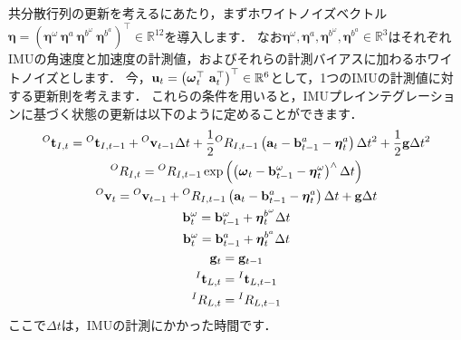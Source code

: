 共分散行列の更新を考えるにあたり，まずホワイトノイズベクトル$\boldsymbol \eta = \left( \boldsymbol \eta^{\omega} ~ \boldsymbol \eta^{a} ~ \boldsymbol \eta^{ b^{\omega} } ~ \boldsymbol \eta^{ b^{a} } \right)^{\top} \in \mathbb{R}^{12}$を導入します．
なお$\boldsymbol \eta^{\omega}, \boldsymbol \eta^{a}, \boldsymbol \eta^{ b^{\omega} }, \boldsymbol \eta^{ b^{a} } \in \mathbb{R}^{3}$はそれぞれIMUの角速度と加速度の計測値，およびそれらの計測バイアスに加わるホワイトノイズとします．
今，${\bf u}_{t} = \left( \boldsymbol \omega_{t}^{\top} ~ {\bf a}_{t}^{\top} \right)^{\top} \in \mathbb{R}^{6}$として，1つのIMUの計測値に対する更新則を考えます．
これらの条件を用いると，IMUプレインテグレーションに基づく状態の更新は以下のように定めることができます．
%
\begin{align}
  \begin{gathered}
    {}^{O}{\bf t}_{I, t} = {}^{O}{\bf t}_{I, t-1} + {}^{O}{\bf v}_{t-1} \Delta t + \frac{1}{2} {}^{O}R_{I, t-1} \left( {\bf a}_{t} - {\bf b}_{t-1}^{a} - \boldsymbol \eta_{t}^{a} \right)\Delta t^{2} + \frac{1}{2} {\bf g} \Delta t^{2} \\
%
    {}^{O}R_{I, t} = {}^{O}R_{I, t-1} \exp \left( \left( \boldsymbol \omega_{t} - {\bf b}_{t-1}^{\omega} - \boldsymbol \eta_{t}^{\omega} \right)^{\wedge} \Delta t \right) \\
%
    {}^{O}{\bf v}_{t} = {}^{O}{\bf v}_{t-1} + {}^{O}R_{I, t-1} \left( {\bf a}_{t} - {\bf b}_{t-1}^{a} - \boldsymbol \eta_{t}^{a} \right) \Delta t + {\bf g} \Delta t \\
%
    {\bf b}_{t}^{\omega} = {\bf b}_{t-1}^{\omega} + \boldsymbol \eta_{t}^{ b^{\omega} } \Delta t \\
%
    {\bf b}_{t}^{\omega} = {\bf b}_{t-1}^{a} + \boldsymbol \eta_{t}^{ b^{a} } \Delta t \\
%
    {\bf g}_{t} = {\bf g}_{t-1} \\
%
    {}^{I}{\bf t}_{L, t} = {}^{I}{\bf t}_{L, t-1} \\
%
    {}^{I}R_{L, t} = {}^{I}R_{L, t-1}
  \end{gathered}
  \label{eq:discrete_imu_preintegration_tight}
\end{align}
%
ここで$\Delta t$は，IMUの計測にかかった時間です．
%

